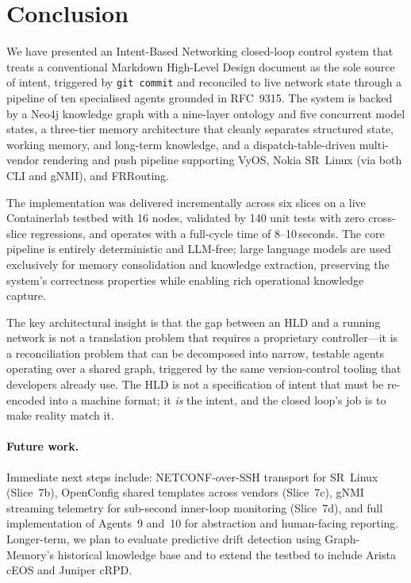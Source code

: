 \documentclass[acmtog]{acmart}
\renewcommand\_{\textunderscore\allowbreak}
\begin{document}
\section{Conclusion}\label{sec:conclusion}

We have presented an Intent-Based Networking closed-loop control
system that treats a conventional Markdown High-Level Design
document as the sole source of intent, triggered by \texttt{git
commit} and reconciled to live network state through a pipeline of
ten specialised agents grounded in RFC~9315. The system is backed
by a Neo4j knowledge graph with a nine-layer ontology and five
concurrent model states, a three-tier memory architecture that
cleanly separates structured state, working memory, and long-term
knowledge, and a dispatch-table-driven multi-vendor rendering and
push pipeline supporting VyOS, Nokia SR~Linux (via both CLI and
gNMI), and FRRouting.

The implementation was delivered incrementally across six slices on
a live Containerlab testbed with 16 nodes, validated by 140 unit
tests with zero cross-slice regressions, and operates with a
full-cycle time of 8--10\,seconds. The core pipeline is entirely
deterministic and LLM-free; large language models are used
exclusively for memory consolidation and knowledge extraction,
preserving the system's correctness properties while enabling
rich operational knowledge capture.

The key architectural insight is that the gap between an HLD and a
running network is not a translation problem that requires a
proprietary controller---it is a reconciliation problem that can be
decomposed into narrow, testable agents operating over a shared
graph, triggered by the same version-control tooling that
developers already use. The HLD is not a specification of intent
that must be re-encoded into a machine format; it \emph{is} the
intent, and the closed loop's job is to make reality match it.

\paragraph{Future work.}
Immediate next steps include: NETCONF-over-SSH transport for
SR~Linux (Slice~7b), OpenConfig shared templates across vendors
(Slice~7c), gNMI streaming telemetry for sub-second inner-loop
monitoring (Slice~7d), and full implementation of Agents~9 and~10
for abstraction and human-facing reporting. Longer-term, we plan
to evaluate predictive drift detection using Graph-Memory's
historical knowledge base and to extend the testbed to include
Arista cEOS and Juniper cRPD.




\end{document}
